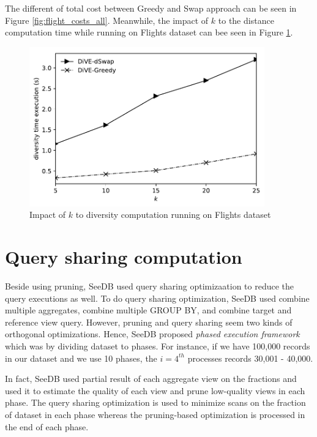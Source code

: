 \documentclass{article}
\begin{document}
The different of total cost between Greedy and Swap approach can be seen in Figure \ref{fig:flight_costs_all}. Meanwhile, the impact of $k$ to the distance computation time while running on Flights dataset can bee seen in Figure \ref{fig:impact-of-k-diversity-computation}.

\begin{figure}
	\begin{center}
		\includegraphics[width=4.0in]{figures/impact_of_k_to_diversity_cost}
		\vspace{-12pt}
		\caption{Impact of $k$ to diversity computation running on Flights dataset}
		\label{fig:impact-of-k-diversity-computation}
		
	\end{center}
\end{figure}



\section{Query sharing computation}

Beside using pruning, SeeDB used query sharing optimizaation to reduce the query executions as well. To do query sharing optimization, SeeDB used combine multiple aggregates, combine multiple GROUP BY, and combine target and reference view query. However, pruning and query sharing seem two kinds of orthogonal optimizations. Hence, SeeDB proposed \textit{phased execution framework} which was by dividing dataset to phases. For instance, if we have 100,000 records in our dataset and we use 10 phases, the $i = 4^{th}$ processes records 30,001 - 40,000. 

In fact, SeeDB used partial result of each aggregate view on the fractions and used it to estimate the quality of each view and prune low-quality views in each phase. The query sharing optimization is used to minimize scans on the fraction of dataset in each phase whereas the pruning-based optimization is processed in the end of each phase.
\end{document}

